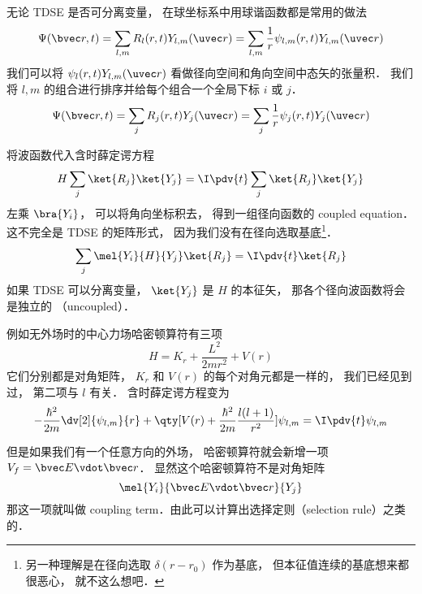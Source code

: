 
无论 TDSE 是否可分离变量， 在球坐标系中用球谐函数都是常用的做法
\begin{equation}\label{RYTDSE_eq1}
\Psi(\bvec r, t) = \sum_{l,m} R_l (r, t) Y_{l,m} (\uvec r) = \sum_{l,m} \frac{1}{r} \psi_{l,m} (r, t) Y_{l,m} (\uvec r)
\end{equation}
我们可以将 $\psi_l (r, t) Y_{l,m} (\uvec r)$ 看做径向空间和角向空间中态矢的张量积． 我们将 $l, m$ 的组合进行排序并给每个组合一个全局下标 $i$ 或 $j$．
\begin{equation}
\Psi(\bvec r, t) = \sum_j R_j (r, t) Y_j (\uvec r) = \sum_j \frac{1}{r} \psi_j (r, t) Y_j (\uvec r)
\end{equation}

将波函数代入含时薛定谔方程
\begin{equation}
H \sum_j\ket{R_j}\ket{Y_j} = \I \pdv{t}  \sum_j\ket{R_j}\ket{Y_j}
\end{equation}
左乘 $\bra{Y_i}$， 可以将角向坐标积去， 得到一组径向函数的 coupled equation． 这不完全是 TDSE 的矩阵形式， 因为我们没有在径向选取基底\footnote{另一种理解是在径向选取 $\delta(r - r_0)$ 作为基底， 但本征值连续的基底想来都很恶心， 就不这么想吧．}．
\begin{equation}
\sum_j \mel{Y_i}{H}{Y_j} \ket{R_j} = \I \pdv{t} \ket{R_j}
\end{equation}
如果 TDSE 可以分离变量， $\ket{Y_j}$ 是 $H$ 的本征矢， 那各个径向波函数将会是独立的 （uncoupled）．

例如无外场时的中心力场哈密顿算符有三项
\begin{equation}
H = K_r + \frac{L^2}{2mr^2} + V(r)
\end{equation}
它们分别都是对角矩阵， $K_r$ 和 $V(r)$ 的每个对角元都是一样的， 我们已经见到过， 第二项与 $l$ 有关． 含时薛定谔方程变为
\begin{equation}
-\frac{\hbar^2}{2m} \dv[2]{\psi_{l,m}}{r} + \qty[V(r) + \frac{\hbar^2}{2m}\frac{l(l + 1)}{r^2}]\psi_{l,m} = \I \pdv{t} \psi_{l,m}
\end{equation}

但是如果我们有一个任意方向的外场， 哈密顿算符就会新增一项 $V_f = \bvec E \vdot \bvec r$． 显然这个哈密顿算符不是对角矩阵
\begin{equation}
\mel{Y_i}{\bvec E \vdot \bvec r}{Y_j}
\end{equation}
那这一项就叫做 coupling term．由此可以计算出选择定则（selection rule）之类的．
